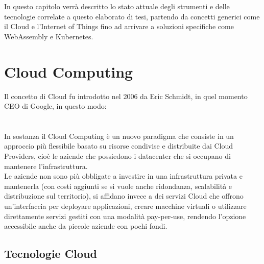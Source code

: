 In questo capitolo verrà descritto lo stato attuale degli strumenti e delle tecnologie correlate a questo elaborato di tesi, partendo da concetti generici come il Cloud e l'Internet of Things fino ad arrivare a soluzioni specifiche come WebAssembly e Kubernetes.

\section{Cloud Computing}

Il concetto di Cloud fu introdotto nel 2006 da Eric Schmidt, in quel momento CEO di Google, in questo modo:\\\\
\\

In sostanza il Cloud Computing\cite{Pallis2010Cloud} è un nuovo paradigma che consiste in un approccio più flessibile basato su risorse condivise e distribuite dai Cloud Providers, cioè le aziende che possiedono i datacenter che si occupano di mantenere l'infrastruttura.\\
Le aziende non sono più obbligate a investire in una infrastruttura privata e mantenerla (con costi aggiunti se si vuole anche ridondanza, scalabilità e distribuzione sul territorio), si affidano invece a dei servizi Cloud che offrono un'interfaccia per deployare applicazioni, creare macchine virtuali o utilizzare direttamente servizi gestiti con una modalità pay-per-use, rendendo l'opzione accessibile anche da piccole aziende con pochi fondi. 

\subsection{Tecnologie Cloud}

